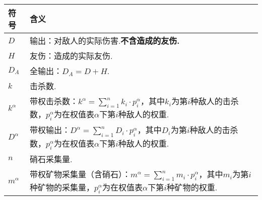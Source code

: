 \documentclass{ctexart}
\begin{document}
\begin{longtable}{|>{\centering\arraybackslash}p{3em}|>{\centering\arraybackslash}p{30em}|}
    \hline

    符号         & 含义                                                                                                                 \\

    \hline

    $D$        & 输出：对敌人的实际伤害\footnotemark.\textbf{不含造成的友伤.}                                                                         \\

    \hline

    $H$        & 友伤：造成的实际友伤.                                                                                                        \\

    \hline

    $D_A$      & 全输出：$D_A = D + H$.                                                                                                 \\

    \hline

    $k$        & 击杀数.                                                                                                               \\

    \hline

    $k^\alpha$ & 带权击杀数：$k^\alpha = \sum_{i = 1}^{n} k_i \cdot p^\alpha_i$，其中$k_i$为第$i$种敌人的击杀数，$p^\alpha_i$为在权值表$\alpha$下第$i$种敌人的权重. \\

    \hline

    $D^\alpha$ & 带权输出：$D^\alpha = \sum_{i = 1}^{n} D_i \cdot p^\alpha_i$，其中$D_i$为第$i$种敌人的击杀数，$p^\alpha_i$为在权值表$\alpha$下第$i$种敌人的权重.  \\

    \hline

    $n$        & 硝石采集量.                                                                                                             \\

    \hline

    $m^\alpha$        & 带权矿物采集量（含硝石）：$m^\alpha = \sum_{i = 1}^{n} m_i \cdot p^\alpha_i$，其中$m_i$为第$i$种矿物的采集量，$p^\alpha_i$为在权值表$\alpha$下第$i$种矿物的权重.                                                                                                    \\


\end{longtable}
\end{document}
